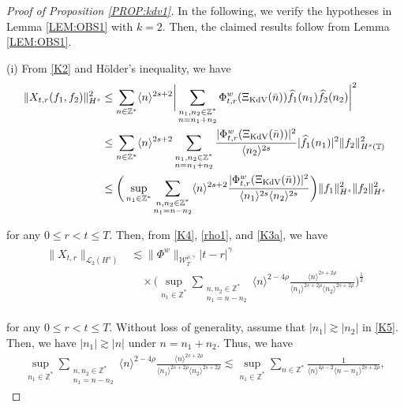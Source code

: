 \documentclass[letterpaper, 11pt,  reqno]{amsart}
\newcommand{\1}{\hspace{0.5mm}\text{I}\hspace{0.5mm}}
\newcommand{\noi}{\noindent}
\newcommand{\Z}{\mathbb{Z}}
\newcommand{\T}{\mathbb{T}}
\newcommand{\g}{\gamma}
\newcommand{\ft}{\widehat}
\newcommand{\les}{\lesssim}
\newcommand{\ges}{\gtrsim}
\newcommand{\jb}[1]
{\langle #1 \rangle}
\newcommand{\cL}{\mathcal{L}}
\newcommand{\W}{\mathcal{W}}
\newcommand{\KDV}{\text{\rm KdV} }
\numberwithin{equation}{section}
\numberwithin{theorem}{section}
\begin{document}
 
 



\begin{proof}[Proof of Proposition \ref{PROP:kdv1}]

In the following, we verify the hypotheses
in Lemma \ref{LEM:OBS1} 
with $k = 2$.
Then, the claimed results follow from 
Lemma \ref{LEM:OBS1}.



\medskip

\noi
(i)
From \eqref{K2}
and H\"older's inequality, 
we have
\begin{align}
\begin{aligned}
\| X_{t,r} (f_1,f_2)\|_{H^s}^2 
&\le \sum_{n \in \Z^*} \jb{n}^{2s+2} \bigg |  \sum_{ \substack{n_1, n_2 \in \Z^*\\n = n_1+n_2}}
\Phi^{w}_{t,r}(\Xi_\KDV(\bar n) ) 
\ft f_1(n_1)  \ft f_2 (n_2)  \bigg|^2 \\
&\le \sum_{n \in \Z^*} \jb{n}^{2s+2}   \sum_{ \substack{n_1, n_2 \in \Z^*\\n = n_1+n_2}}
\frac{|\Phi^{w}_{t,r}(\Xi_\KDV(\bar n) )|^2 }{\jb{n_2}^{2s}}
|\ft f_1(n_1)|^2
\|f_2\|_{H^s(\T)}^2
\\
&\leq  
\bigg(\sup_{n_1 \in \Z^*}
\sum_{\substack{n, n_2 \in \Z^*\\n_1 = n - n_2}} \jb{n}^{2s+2}
\frac{|\Phi^{w}_{t,r} (\Xi_\KDV(\bar n)) |^2}{\jb{n_1}^{2s}\jb{n_2}^{2s}} \bigg)
\|f_1\|_{H^s}^2
\|f_2\|_{H^s}^2
\end{aligned}
\label{K4}
\end{align}


\noi
for any $0 \le r <  t \le T$.
Then, from 
\eqref{K4}, 
 \eqref{rho1}, and
 \eqref{K3a},
 we have 
\begin{align}
\begin{aligned}
\|X_{t,r} \|_{\cL_2 (H^s)}
&\les
 \| \Phi^w \|_{\W_T^{\rho,\g}} 
  |t-r|^{\g} \\
  & \quad
  \times 
\bigg(\sup_{n_1 \in \Z^*}
\sum_{\substack{n, n_2 \in \Z^*\\n_1 = n - n_2}} 
 \jb{n}^{2- 4\rho}
 \frac{\jb{n}^{2s+2\rho}}{\jb{n_1}^{2s+2\rho} \jb{n_2}^{2s +2\rho}}\bigg)^\frac 12
\end{aligned}
\label{K5}
\end{align}


\noi
for any $0 \le r <  t \le T$.
Without loss of generality, 
assume that $|n_1|\ges |n_2|$ in \eqref{K5}.
Then, we have $|n_1|\ges |n|$ under $n = n_1 + n_2$.
Thus, we have 
\begin{align}
\sup_{n_1 \in \Z^*}
\sum_{\substack{n, n_2 \in \Z^*\\n_1 = n - n_2}} 
 \jb{n}^{2- 4\rho}
 \frac{\jb{n}^{2s+2\rho}}{\jb{n_1}^{2s+2\rho} \jb{n_2}^{2s +2\rho}}
\les 
\sup_{n_1 \in \Z^*}
\sum_{n\in \Z^*}
 \frac{1}{\jb{n}^{4\rho- 2}\jb{n - n_1}^{2s +2\rho}}, 
\label{K5a}
\end{align}


\end{proof}
\end{document}
